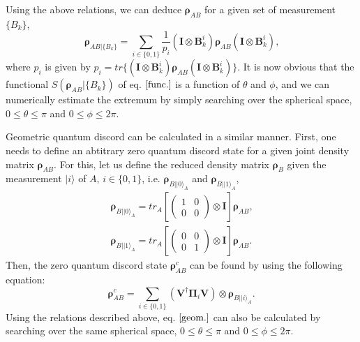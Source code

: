 \documentclass[%
 reprint,
 amsmath,amssymb,
 aps,
]{revtex4-1}
\begin{document}
Using the above relations, we can deduce $\boldsymbol{\rho}_{AB}$ for a given set of measurement $\{B_k\}$,
\begin{equation}
\boldsymbol{\rho}_{AB|\{B_k\}} = \sum_{i \in \{0, 1\}} \frac{1}{p_i} (\textbf{I} \otimes \boldsymbol{B}_k^i) \boldsymbol{\rho}_{AB} (\textbf{I} \otimes \boldsymbol{B}_k^i) \text{,}
\end{equation}
\noindent where $p_i$ is given by $p_i = tr \{ (\textbf{I} \otimes \boldsymbol{B}_k^i) \boldsymbol{\rho}_{AB} (\textbf{I} \otimes \boldsymbol{B}_k^i) \}$. It is now obvious that the functional $\textit{S}(\boldsymbol{\rho}_{AB}|\{B_k\})$ of eq. $\ref{func.}$ is a function of $\theta$ and $\phi$, and we can numerically estimate the extremum by simply searching over the spherical space, $0 \le \theta \le \pi$ and $0 \le \phi \le 2\pi$.

Geometric quantum discord can be calculated in a similar manner. First, one needs to define an abtitrary zero quantum discord state for a given joint density matrix $\boldsymbol{\rho}_{AB}$. For this, let us define the reduced density matrix $\boldsymbol{\rho}_B$ given the measurement $|i\rangle$ of $A$, $i \in \{0, 1\}$, i.e. $\boldsymbol{\rho}_{B||0\rangle_A}$ and $\boldsymbol{\rho}_{B||1\rangle_A}$,
\begin{eqnarray}
\boldsymbol{\rho}_{B||0\rangle_A} = 
tr_A \left[ \left( \begin{array}{cc}
1 & 0 \\
0 & 0 \end{array} \right) \otimes
\boldsymbol{I} \right] \boldsymbol{\rho}_{AB} \text{,} \\
\boldsymbol{\rho}_{B||1\rangle_A} = 
tr_A \left[ \left( \begin{array}{cc}
0 & 0 \\
0 & 1 \end{array} \right) \otimes
\boldsymbol{I} \right] \boldsymbol{\rho}_{AB} \text{.}
\end{eqnarray}
\noindent Then, the zero quantum discord state $\boldsymbol{\rho}_{AB}^{c}$ can be found by using the following equation:
\begin{equation}
\boldsymbol{\rho}_{AB}^{c} = \sum_{i \in \{0,1\}} \left( \textbf{V}^{\dagger} \boldsymbol{\Pi}_i \textbf{V} \right) \otimes \boldsymbol{\rho}_{B||i\rangle_A} \text{.}
\end{equation}
\noindent Using the relations described above, eq. $\ref{geom.}$ can also be calculated by searching over the same spherical space, $0 \le \theta \le \pi$ and $0 \le \phi \le 2\pi$.
\end{document}
